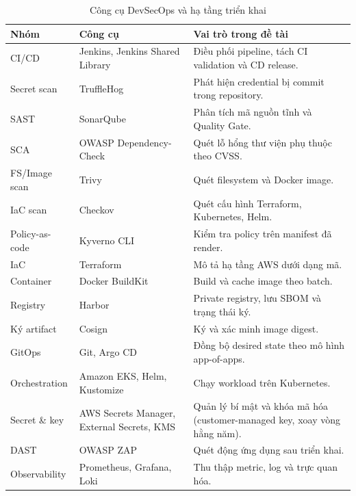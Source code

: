 \begin{table}[H]
\centering
\small
\caption{Công cụ DevSecOps và hạ tầng triển khai}
\label{tab:tech-stack-devsecops}
\begin{tabularx}{\textwidth}{p{}p{}Y}
\toprule
\textbf{Nhóm} & \textbf{Công cụ} & \textbf{Vai trò trong đề tài} \\
\midrule
CI/CD & Jenkins, Jenkins Shared Library & Điều phối pipeline, tách CI validation và CD release. \\
Secret scan & TruffleHog & Phát hiện credential bị commit trong repository. \\
SAST & SonarQube & Phân tích mã nguồn tĩnh và Quality Gate. \\
SCA & OWASP Dependency-Check & Quét lỗ hổng thư viện phụ thuộc theo CVSS. \\
FS/Image scan & Trivy & Quét filesystem và Docker image. \\
IaC scan & Checkov & Quét cấu hình Terraform, Kubernetes, Helm. \\
Policy-as-code & Kyverno CLI & Kiểm tra policy trên manifest đã render. \\
IaC & Terraform & Mô tả hạ tầng AWS dưới dạng mã. \\
Container & Docker BuildKit & Build và cache image theo batch. \\
Registry & Harbor & Private registry, lưu SBOM và trạng thái ký. \\
Ký artifact & Cosign & Ký và xác minh image digest. \\
GitOps & Git, Argo CD & Đồng bộ desired state theo mô hình app-of-apps. \\
Orchestration & Amazon EKS, Helm, Kustomize & Chạy workload trên Kubernetes. \\
Secret \& key & AWS Secrets Manager, External Secrets, KMS & Quản lý bí mật và khóa mã hóa (customer-managed key, xoay vòng hằng năm). \\
DAST & OWASP ZAP & Quét động ứng dụng sau triển khai. \\
Observability & Prometheus, Grafana, Loki & Thu thập metric, log và trực quan hóa. \\
\bottomrule
\end{tabularx}
\end{table}
